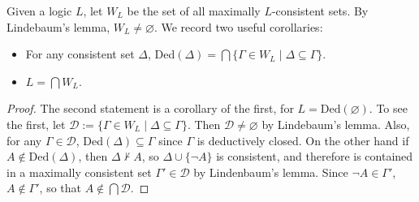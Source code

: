 \documentclass[12pt]{article}
\begin{document}
Given a logic $L$, let $W_L$ be the set of all maximally $L$-consistent sets.  By Lindebaum's lemma, $W_L\ne \varnothing$.  We record two useful corollaries:
\begin{itemize}
\item For any consistent set $\Delta$, Ded$(\Delta)= \bigcap \lbrace \Gamma \in W_L \mid \Delta \subseteq \Gamma \rbrace$.
\item $L=\bigcap W_L$.
\end{itemize}
\begin{proof}  The second statement is a corollary of the first, for $L= \mbox{Ded}(\varnothing)$.  To see the first, let $\mathcal{D}:= \lbrace \Gamma \in W_L \mid \Delta \subseteq \Gamma \rbrace$.  Then $\mathcal{D} \ne \varnothing$ by Lindebaum's lemma.  Also, for any $\Gamma \in \mathcal{D}$, Ded$(\Delta) \subseteq \Gamma$ since $\Gamma$ is deductively closed.  On the other hand if $A \notin \mbox{Ded}(\Delta)$, then $\Delta\not\vdash A$, so $\Delta\cup \lbrace \neg A\rbrace$ is consistent, and therefore is contained in a maximally consistent set $\Gamma' \in \mathcal{D}$ by Lindenbaum's lemma.  Since $\neg A \in \Gamma'$, $A\notin \Gamma'$, so that $A\notin \bigcap \mathcal{D}$.
\end{proof}

\end{document}
